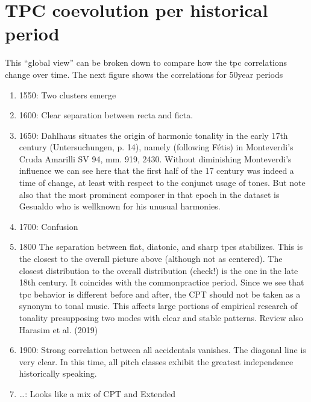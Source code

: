 \documentclass[letterpaper,10pt,english]{sphinxmanual}
\begin{document}
\section{TPC coevolution per historical period}
\label{\detokenize{5_notes:tpc-coevolution-per-historical-period}}
\sphinxAtStartPar
This “global view” can be broken down to compare how the tpc
correlations change over time. The next figure shows the correlations
for 50\sphinxhyphen{}year periods
\begin{enumerate}
%
\item {} 
\sphinxhyphen{}1550: Two clusters emerge

\item {} 
\sphinxhyphen{}1600: Clear separation between recta and ficta.

\item {} 
\sphinxhyphen{}1650: Dahlhaus situates the origin of harmonic tonality in the
early 17th century (Untersuchungen, p. 14), namely (following Fétis)
in Monteverdi’s Cruda Amarilli SV 94, mm. 9\sphinxhyphen{}19, 24\sphinxhyphen{}30. Without
diminishing Monteverdi’s influence we can see here that the first
half of the 17 century was indeed a time of change, at least with
respect to the conjunct usage of tones. But note also that the most
prominent composer in that epoch in the dataset is Gesualdo who is
well\sphinxhyphen{}known for his unusual harmonies.

\item {} 
\sphinxhyphen{}1700: Confusion

\item {} 
\sphinxhyphen{}1800 The separation between flat, diatonic, and sharp tpcs
stabilizes. This is the closest to the overall picture above
(although not as centered). The closest distribution to the overall
distribution (check!) is the one in the late 18th century. It
coincides with the common\sphinxhyphen{}practice period. Since we see that tpc
behavior is different before and after, the CPT should not be taken
as a synonym to tonal music. This affects large portions of empirical
research of tonality presupposing two modes with clear and stable
patterns. Review also Harasim et al. (2019)

\item {} 
\sphinxhyphen{}1900: Strong correlation between all accidentals vanishes. The
diagonal line is very clear. In this time, all pitch classes exhibit
the greatest independence historically speaking.

\item {} 
\sphinxhyphen{}…: Looks like a mix of CPT and Extended

\end{enumerate}
\end{document}
